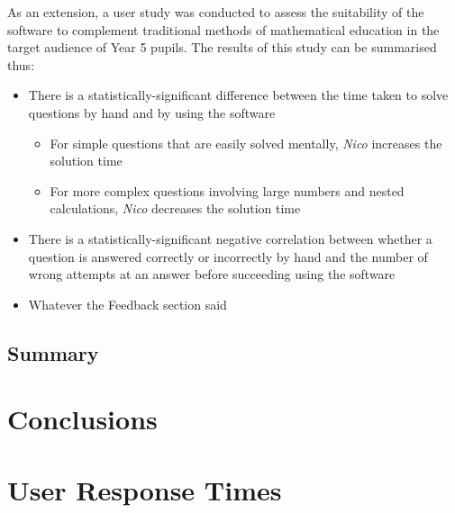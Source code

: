 \documentclass[12pt,twoside,notitlepage,xetex]{report}
\begin{document}
As an extension, a user study was conducted to assess the suitability of the software to complement traditional methods of mathematical education in the target audience of Year 5 pupils.  The results of this study can be summarised thus:
\begin{itemize}
\item There is a statistically-significant difference between the time taken to solve questions by hand and by using the software
\begin{itemize}
\item For simple questions that are easily solved mentally, \emph{Nico} increases the solution time
\item For more complex questions involving large numbers and nested calculations, \emph{Nico} decreases the solution time
\end{itemize}
\item There is a statistically-significant negative correlation between whether a question is answered correctly or incorrectly by hand and the number of wrong attempts at an answer before succeeding using the software
\item Whatever the Feedback section said
\end{itemize}

\section{Summary}


\cleardoublepage
\chapter{Conclusions}





\cleardoublepage



\cleardoublepage

\appendix

\chapter{User Response Times}
\end{document}
